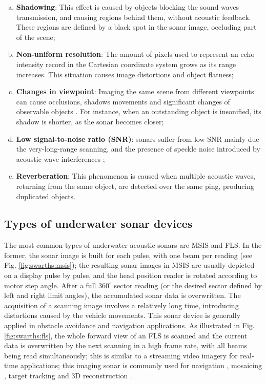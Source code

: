 \documentclass[final,5p,times]{elsarticle}
\begin{document}
\begin{enumerate}[a)]
    \item \textbf{Shadowing}: This effect is caused by objects blocking the
sound waves transmission, and causing regions behind them, without acoustic feedback. These regions are defined by a black spot in the sonar image, occluding part of the scene;
    \item \textbf{Non-uniform resolution}: The amount of pixels used to represent an echo intensity record in the Cartesian coordinate system grows as its range increases. This situation causes image distortions and object flatness;
    \item \textbf{Changes in viewpoint}: Imaging the same scene from different viewpoints can cause occlusions, shadows movements and significant  changes of observable objects \cite{hurtos2014}. For instance, when an    outstanding object is insonified, its shadow is shorter, as the sonar becomes closer;
    \item \textbf{Low signal-to-noise ratio (SNR)}: sonars suffer from low SNR mainly due the very-long-range scanning, and the presence of speckle noise introduced by acoustic wave interferences \cite{abbott1979};
    \item \textbf{Reverberation}: This phenomenon is caused when multiple acoustic waves, returning from the same object, are detected over the same ping, producing duplicated objects.
\end{enumerate}




\subsection{Types of underwater sonar devices}
\label{sonar:devices}

The most common types of underwater acoustic sonars are MSIS and FLS. In
the former, the sonar image is built for each pulse, with one beam per
reading (see Fig. \ref{fig:swarths:msis}); the resulting sonar images in MSIS are usually depicted on a display pulse by pulse, and the head position reader is rotated according to motor step angle. After a full $360^{\circ}$ sector reading (or the desired sector defined by left and right limit angles), the accumulated sonar data is overwritten. The acquisition of a scanning image involves a relatively long time, introducing distortions caused by the vehicle movements. This sonar device is generally applied in obstacle avoidance \cite{ganesan2015} and navigation \cite{ribas2010} applications. As illustrated in Fig. \ref{fig:swarths:fls}, the whole forward view of an FLS is scanned and the current data is overwritten by the next scanning in a high frame rate, with all beams being read simultaneously; this is similar to a streaming video imagery for real-time applications; this imaging sonar is commonly used for navigation \cite{fallon2013}, mosaicing \cite{hurtos2014}, target tracking \cite{liu2016} and 3D reconstruction \cite{huang2015a}.
\end{document}

